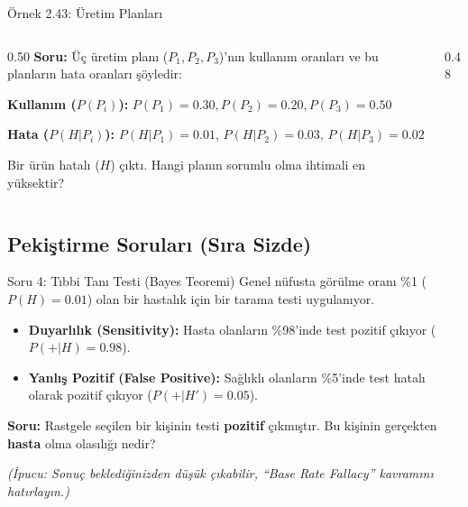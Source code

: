 \documentclass[light]{lutbeamer}
\begin{document}
\begin{frame}{Örnek 2.43: Üretim Planları}
    \begin{columns}[T]
        \begin{column}{0.50\textwidth}
            \scriptsize
            \textbf{Soru:}
            Üç üretim planı ($P_1, P_2, P_3$)'nın kullanım oranları ve bu planların hata oranları şöyledir:

            \vspace{0.1cm}
            \textbf{Kullanım ($P(P_i)$):}
            $P(P_1)=0.30, P(P_2)=0.20, P(P_3)=0.50$

            \textbf{Hata ($P(H|P_i)$):}
            $P(H|P_1)=0.01$, $P(H|P_2)=0.03$, $P(H|P_3)=0.02$

            Bir ürün hatalı ($H$) çıktı. Hangi planın sorumlu olma ihtimali en yüksektir?
        \end{column}
        \begin{column}{0.48\textwidth}
        \end{column}
    \end{columns}
\end{frame}



\subsection{Pekiştirme Soruları (Sıra Sizde)}

\begin{frame}{Soru 4: Tıbbi Tanı Testi (Bayes Teoremi)}
    Genel nüfusta görülme oranı \%1 ($P(H)=0.01$) olan bir hastalık için bir tarama testi uygulanıyor.
    \begin{itemize}
        \item \textbf{Duyarlılık (Sensitivity):} Hasta olanların \%98'inde test pozitif çıkıyor ($P(+|H)=0.98$).
        \item \textbf{Yanlış Pozitif (False Positive):} Sağlıklı olanların \%5'inde test hatalı olarak pozitif çıkıyor ($P(+|H')=0.05$).
    \end{itemize}

    \textbf{Soru:} Rastgele seçilen bir kişinin testi \textbf{pozitif} çıkmıştır. Bu kişinin gerçekten \textbf{hasta} olma olasılığı nedir?

    \vspace{0.2cm}
    \footnotesize
    \textit{(İpucu: Sonuç beklediğinizden düşük çıkabilir, ``Base Rate Fallacy'' kavramını hatırlayın.)}
\end{frame}
\end{document}

